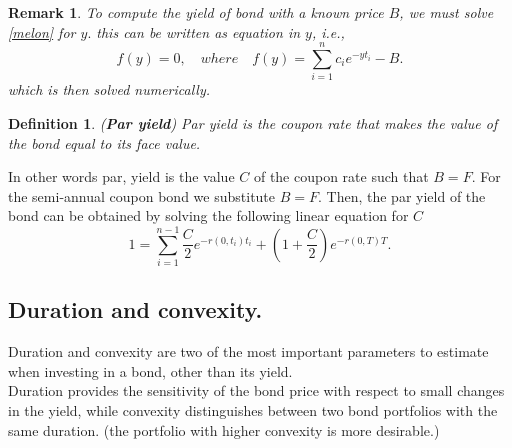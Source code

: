 \documentclass{book}
\newtheorem{definition}{Definition}[section]
\newtheorem{remark}{Remark}[section]
\begin{document}
\begin{remark}
To compute the yield of bond with a known price $B$, we must solve \eqref{melon} for $y.$ this can be written as  equation in $y$, i.e., 
$$
f(y)=0, \quad where\quad f(y)=\sum_{i=1}^{n}c_{i}e^{-y t_{i}}-B.
$$
which is then solved numerically.
\end{remark}
\begin{definition}(\textbf{Par yield})
Par yield is the coupon rate that makes the value of the bond equal to its face value.
\end{definition}
In other words par, yield is the value $C$ of the coupon rate such that $B=F.$ For the semi-annual coupon bond we substitute $B=F$. Then, the par yield of the bond can be obtained by solving the following linear equation for $C$
\begin{equation}
1=\sum_{i=1}^{n-1}\frac{C}{2}e^{-r(0,t_{i})t_{i}}+(1+\frac{C}{2})e^{-r(0,T)T}.
\end{equation}
\subsection{Duration and convexity.}
Duration and convexity are two of the most important parameters to estimate when investing in a bond, other than its yield.\\

Duration provides the sensitivity of the bond price with respect to small changes in the yield, while convexity distinguishes between two bond portfolios with the same duration. (the portfolio with higher convexity is more desirable.)
\end{document}
